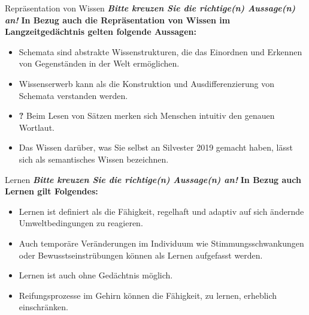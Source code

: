 \documentclass[a4paper]{article}
\newcommand{\ACorrectAnswer}{\rlap{$\square$}{\raisebox{2pt}{\large\hspace{1pt}\ding{51}}}\hspace{-2.5pt}}
\newcommand{\AWrongAnswer}{\rlap{$\square$}{\large\hspace{1pt}\ding{55}}}
\newcommand{\AnUnsureAnswer}{\rlap{$\square$}{\large\hspace{1pt}\textbf?}}
\newcommand{\defaultCorrect}{\ding{51}}
\newcommand{\defaultWrong}{\ding{55}}
\newcommand{\defaultUnsure}{\textbf{?}}
\newenvironment{answers}{\begin{itemize}}{\end{itemize}}
\newcommand{\correct}{\defaultCorrect}
\newcommand{\wrong}{\defaultWrong}
\newcommand{\unsure}{\defaultUnsure}
\newenvironment{question}[2]{%
    \section[#1 \normalfont(#2)]{#1\\\small\normalfont\hyperlink{tableofcontents}{zurück zum Inhaltsverzeichnis}}%
}{%
    \newpage%
}
\newcommand{\questiontext}[1]{\textbf{#1}}
\newcommand{\assignment}[1]{\textbf{\textit{#1}}\newline}
\newenvironment{multiple-choice}[1]{%
    \begin{question}{#1}{Multiple Choice}%
    \renewenvironment{answers}{%
        \begin{multiple-choice-list}}{\end{multiple-choice-list}%
    }%
    \renewcommand{\correct}{\ACorrectAnswer}%
    \renewcommand{\wrong}{\AWrongAnswer}%
    \renewcommand{\unsure}{\AnUnsureAnswer}%
}%
{%
    \renewcommand{\correct}{\defaultCorrect}%
    \renewcommand{\wrong}{\defaultWrong}%
    \renewcommand{\unsure}{\defaultUnsure}%
    \end{question}%
}
\begin{document}
\begin{multiple-choice}{Repräsentation von Wissen}
    \assignment{Bitte kreuzen Sie die richtige(n) Aussage(n) an!}
    \questiontext{In Bezug auch die Repräsentation von Wissen im Langzeitgedächtnis gelten folgende Aussagen:}
    \begin{answers}
        \item[\correct] Schemata sind abstrakte Wissenstrukturen, die das Einordnen und Erkennen von Gegenständen in der Welt ermöglichen.
        \item[\correct] Wissenserwerb kann als die Konstruktion und Ausdifferenzierung von Schemata verstanden werden.
        \item[\unsure] Beim Lesen von Sätzen merken sich Menschen intuitiv den genauen Wortlaut.
        \item[\wrong] Das Wissen darüber, was Sie selbst an Silvester 2019 gemacht haben, lässt sich als semantisches Wissen bezeichnen.
    \end{answers}
\end{multiple-choice}

\begin{multiple-choice}{Lernen}
    \assignment{Bitte kreuzen Sie die richtige(n) Aussage(n) an!}
    \questiontext{In Bezug auch Lernen gilt Folgendes:}
    \begin{answers}
        \item[\correct] Lernen ist definiert als die Fähigkeit, regelhaft und adaptiv auf sich ändernde Umweltbedingungen zu reagieren.
        \item[\wrong] Auch temporäre Veränderungen im Individuum wie Stimmungsschwankungen oder Bewusstseinstrübungen können als Lernen aufgefasst werden.
        \item[\wrong] Lernen ist auch ohne Gedächtnis möglich.
        \item[\wrong] Reifungsprozesse im Gehirn können die Fähigkeit, zu lernen, erheblich einschränken.
    \end{answers}
\end{multiple-choice}
\end{document}
